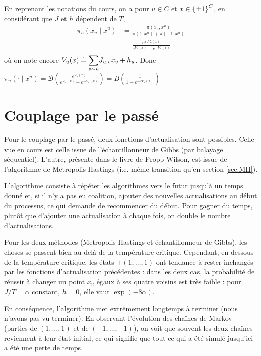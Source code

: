 \documentclass[a4paper,11pt]{article}
\begin{document}
En reprenant les notations du cours, on a pour $u \in C$ et $x \in \left\lbrace \pm 1 \right\rbrace^C$, en considérant que $J$ et $h$ dépendent de $T$,
\begin{align*}
\pi_u(x_u \mid x^u)
&= \frac{\pi(x_u,x^u)}{\pi(1,x^u) + \pi(-1,x^u)}\\
&= \frac{e^{x_u V_u(x)}}{e^{V_u(x)} + e^{-V_u(x)}}
\end{align*}
où on note encore $V_u(x) \doteq \displaystyle{\sum_{v \sim u}^{}} J_{u,v} x_v + h_u$. Donc $\pi_u(\cdot \mid x^u) = \mathcal B(\frac{e^{V_u(x)}}{e^{V_u(x)} + e^{-V_u(x)}}) = B(\frac{1}{1 + e^{-2V_u(x)}})$

\section{Couplage par le passé}

Pour le couplage par le passé, deux fonctions d'actualisation sont possibles. Celle vue en cours est celle issue de l'échantillonneur de Gibbs (par balayage séquentiel). L'autre, présente dans le livre de Propp-Wilson, est issue de l'algorithme de Metropolis-Hastings (i.e. même transition qu'en section \ref{sec:MH}).

L'algorithme consiste à répéter les algorithmes vers le futur jusqu'à un temps donné et, si il n'y a pas eu coalition, ajouter des nouvelles actualisations au début du processus, ce qui demande de recommencer du début. Pour gagner du temps, plutôt que d'ajouter une actualisation à chaque fois, on double le nombre d'actualisations.

Pour les deux méthodes (Metropolis-Hastings et échantillonneur de Gibbs), les choses se passent bien au-delà de la température critique. Cependant, en dessous de la température critique, les états $\pm(1,\hdots,1)$ ont tendance à rester inchangés par les fonctions d'actualisation précédentes : dans les deux cas, la probabilité de réussir à changer un point $x_u$ égaux à ses quatre voisins est très faible : pour $J/T = \alpha$ constant, $h = 0$, elle vaut $\exp(-8 \alpha)$.

En conséquence, l'algorithme met extrêmement longtemps à terminer (nous n'avons pas vu terminer). En observant l'évolution des chaînes de Markov (parties de $(1,\hdots,1)$ et de $(-1,\hdots,-1)$), on voit que souvent les deux chaînes reviennent à leur état initial, ce qui signifie que tout ce qui a été simulé jusqu'ici a été une perte de temps.
\end{document}
